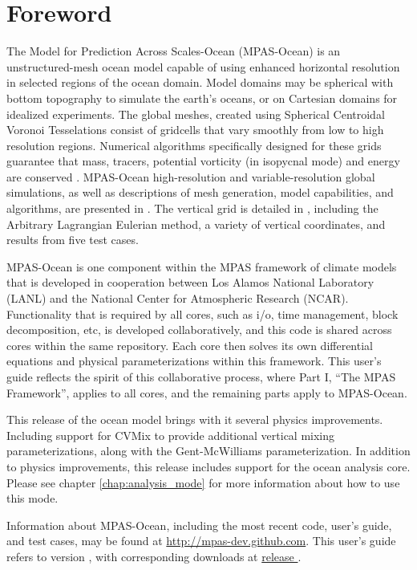 \chapter*{Foreword}
\label{chap:foreword}
The Model for Prediction Across Scales-Ocean (MPAS-Ocean) is an unstructured-mesh ocean model capable of using enhanced horizontal resolution in selected regions of the ocean domain.  Model domains may be spherical with bottom topography to simulate the earth's oceans, or on Cartesian domains for idealized experiments.  The global meshes, created using Spherical Centroidal Voronoi Tesselations \citep{Ringler_ea08od,Ringler_ea11mwr} consist of gridcells that vary smoothly from low to high resolution regions. Numerical algorithms specifically designed for these grids guarantee that mass, tracers, potential vorticity (in isopycnal mode) and energy are conserved \citep{Thurburn_ea09jcp,Ringler_ea10jcp}.  MPAS-Ocean high-resolution and variable-resolution global simulations, as well as descriptions of mesh generation, model capabilities, and algorithms, are presented in \citet{Ringler_ea13om}.  The vertical grid is detailed in \citet{Petersen_ea14om}, including the Arbitrary Lagrangian Eulerian method, a variety of vertical coordinates, and results from five test cases.

MPAS-Ocean is one component within the MPAS framework of climate models that is developed in cooperation between Los Alamos National Laboratory (LANL) and the National Center for Atmospheric Research (NCAR).  Functionality that is required by all cores, such as i/o, time management, block decomposition, etc, is developed collaboratively, and this code is shared across cores within the same repository.  Each core then solves its own differential equations and physical parameterizations within this framework.  This user's guide reflects the spirit of this collaborative process, where Part I, ``The MPAS Framework'', applies to all cores, and the remaining parts apply to MPAS-Ocean.

This release of the ocean model brings with it several physics improvements. Including support for CVMix to provide additional vertical mixing parameterizations, along with the Gent-McWilliams parameterization. In addition to physics improvements, this release includes support for the ocean analysis core. Please see chapter \ref{chap:analysis_mode} for more information about how to use this mode.

Information about MPAS-Ocean, including the most recent code, user's guide, and test cases, may be found at \url{http://mpas-dev.github.com}.  This user's guide refers to version \version, with corresponding downloads at \href{http://mpas-dev.github.com/ocean/release_\version/release_\version.html}{release \version}. \\

